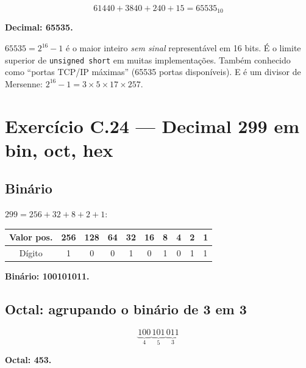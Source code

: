 \documentclass[11pt,a4paper]{article}
\begin{document}
\[
61440 + 3840 + 240 + 15 = \boxed{65535_{10}}
\]

\begin{resposta}\textbf{Decimal: 65535.}\end{resposta}

\begin{obseng}
$65535 = 2^{16} - 1$ \'e o maior inteiro \emph{sem sinal} represent\'avel em 16 bits. \'E o limite superior de \texttt{unsigned short} em muitas implementa\c{c}\~oes. Tamb\'em conhecido como ``portas TCP/IP m\'aximas'' (65535 portas dispon\'iveis). E \'e um divisor de Mersenne: $2^{16} - 1 = 3 \times 5 \times 17 \times 257$.
\end{obseng}

\section{Exerc\'icio C.24 --- Decimal 299 em bin, oct, hex}

\subsection*{Bin\'ario}

$299 = 256 + 32 + 8 + 2 + 1$:

\begin{center}
\renewcommand{\arraystretch}{1.2}
\begin{tabular}{|c|c|c|c|c|c|c|c|c|}
\hline
Valor pos. & 256 & 128 & 64 & 32 & 16 & 8 & 4 & 2 & 1 \\
\hline
D\'igito    & 1   & 0   & 0  & 1  & 0  & 1 & 0 & 1 & 1 \\
\hline
\end{tabular}
\end{center}

\begin{resposta}\textbf{Bin\'ario: 100101011.}\end{resposta}

\subsection*{Octal: agrupando o bin\'ario de 3 em 3}

\[
\underbrace{100}_{4} \, \underbrace{101}_{5} \, \underbrace{011}_{3}
\]

\begin{resposta}\textbf{Octal: 453.}\end{resposta}
\end{document}
